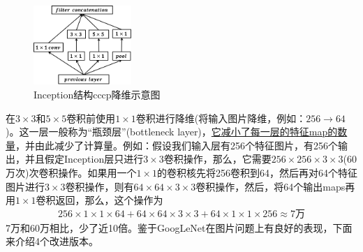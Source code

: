              \begin{figure}[H]
            \centering
            \includegraphics[height=3cm]{images/Inception_structure_cccpDimensionality_reduction.jpg}
            \caption{Inception结构cccp降维示意图}
            \label{fig:Inception结构cccp降维示意图}
            \end{figure}
            \par
            在$3\times 3$和$5\times 5$卷积前使用$1\times 1$卷积进行降维(将输入图片降维，例如：$256\to 64$)。这一层一般称为“瓶颈层”(bottleneck layer)，\underline{它减小了每一层的特征map的数量}，并由此减少了计算量。例如：假设我们输入层有256个特征图片，有256个输出，并且假定Inception层只进行$3\times 3$卷积操作，那么，它需要$256\times 256\times 3\times 3$(60万次)次卷积操作。如果用一个$1\times 1$的卷积核先将256卷积到64，然后再对64个特征图片进行$3\times 3$卷积操作，则有$64\times 64\times 3\times 3$卷积操作，然后，将64个输出maps再用$1\times 1$卷积返回，那么，这个操作为
            \begin{align*}
            256\times 1\times 1\times 64 + 64\times 64 \times 3\times 3 + 64\times 1\times 1\times 256 \approx 7\text{万}
            \end{align*}
            7万和60万相比，少了近10倍。鉴于GoogLeNet在图片问题上有良好的表现，下面来介绍4个改进版本。

